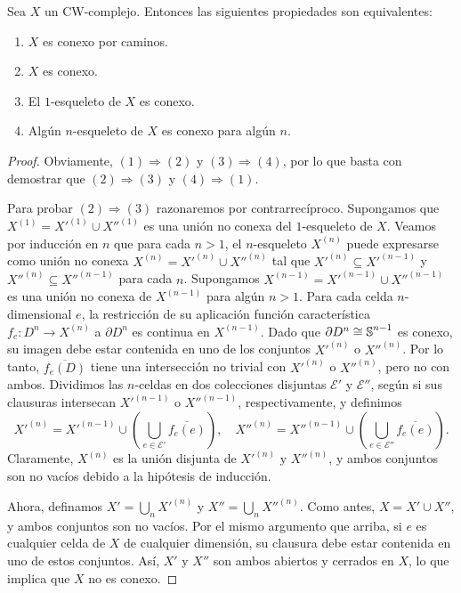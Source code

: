 \begin{teorema}
	Sea $X$ un CW-complejo. Entonces las siguientes propiedades son equivalentes:
	\begin{enumerate}
		\item $X$ es conexo por caminos.
		
		\item $X$ es conexo.
		
		\item El $1$-esqueleto de $X$ es conexo.
		
		\item Algún $n$-esqueleto de $X$ es conexo para algún $n$.
	\end{enumerate}
\end{teorema}
\begin{proof}
	Obviamente, $(1) \Rightarrow (2)$ y $(3) \Rightarrow (4)$, por lo que basta con
	demostrar que $(2) \Rightarrow (3)$ y $(4) \Rightarrow (1)$.
	
	Para probar $(2) \Rightarrow (3)$ razonaremos por contrarrecíproco. Supongamos
	que $X^{(1)}= X'^{(1)}\cup X''^{(1)}$ es una unión no conexa del $1$-esqueleto
	de $X$. Veamos por inducción en $n$ que para cada $n > 1$, el $n$-esqueleto
	$X^{(n)}$ puede expresarse como unión no conexa
	$X^{(n)}= X'^{(n)}\cup X''^{(n)}$ tal que $X'^{(n)}\subseteq X'^{(n-1)}$ y
	$X''^{(n)}\subseteq X''^{(n-1)}$ para cada $n$. Supongamos $X^{(n-1)}= X'^{(n-1)}
	\cup X''^{(n-1)}$ es una unión no conexa de $X^{(n-1)}$ para algún $n > 1$.
	Para cada celda $n$-dimensional $e$, la restricción de su aplicación función característica
	$f_{e} \colon D^{n} \to X^{(n)}$ a $\partial D^{n}$ es continua en $X^{(n-1)}$.
	Dado que $\partial D^{n} \cong \operatorname{\mathbb{S}}^{n-1}$ es conexo, su imagen debe estar contenida
	en uno de los conjuntos $X'^{(n)}$ o $X''^{(n)}$. Por lo tanto, $\overline{f_e(D)}$
	tiene una intersección no trivial con $X'^{(n)}$ o $X''^{(n)}$, pero no con
	ambos. Dividimos las $n$-celdas en dos colecciones disjuntas $\mathcal{E}'$ y $\mathcal{E}
	''$, según si sus clausuras intersecan $X'^{(n-1)}$ o $X''^{(n-1)}$, respectivamente,
	y definimos
	\[
	X'^{(n)}= X'^{(n-1)}\cup \left(\bigcup_{e \in \mathcal{E}'}\overline{f_e(e)}\right
	),\quad X''^{(n)}= X''^{(n-1)}\cup \left(\bigcup_{e \in \mathcal{E}''}\overline
	{f_e(e)}\right).
	\]
	Claramente, $X^{(n)}$ es la unión disjunta de $X'^{(n)}$ y $X''^{(n)}$, y
	ambos conjuntos son no vacíos debido a la hipótesis de inducción.
	
	Ahora, definamos $X' = \bigcup_{n} X'^{(n)}$ y $X'' = \bigcup_{n} X''^{(n)}$.
	Como antes, $X = X' \cup X''$, y ambos conjuntos son no vacíos. Por el mismo argumento
	que arriba, si $e$ es cualquier celda de $X$ de cualquier dimensión, su clausura
	debe estar contenida en uno de estos conjuntos. Así, $X'$ y $X''$ son ambos abiertos
	y cerrados en $X$, lo que implica que $X$ no es conexo.
	

\end{proof}
